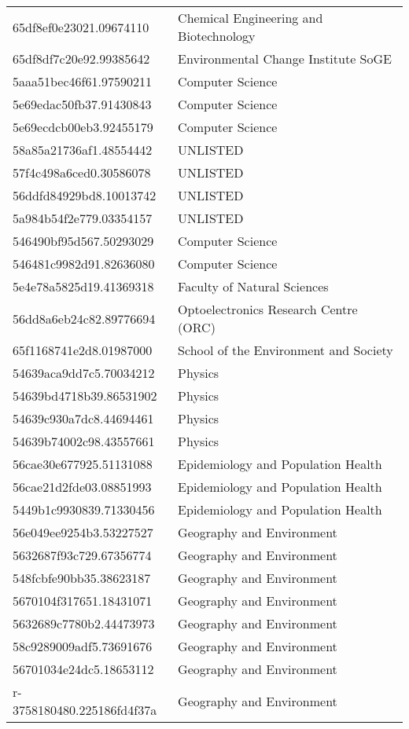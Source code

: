 \begin{tabular}{ll}
65df8ef0e23021.09674110 & Chemical Engineering and Biotechnology \\
65df8df7c20e92.99385642 & Environmental Change Institute SoGE \\
5aaa51bec46f61.97590211 & Computer Science \\
5e69edac50fb37.91430843 & Computer Science \\
5e69ecdcb00eb3.92455179 & Computer Science \\
58a85a21736af1.48554442 & UNLISTED \\
57f4c498a6ced0.30586078 & UNLISTED \\
56ddfd84929bd8.10013742 & UNLISTED \\
5a984b54f2e779.03354157 & UNLISTED \\
546490bf95d567.50293029 & Computer Science \\
546481c9982d91.82636080 & Computer Science \\
5e4e78a5825d19.41369318 & Faculty of Natural Sciences \\
56dd8a6eb24c82.89776694 & Optoelectronics Research Centre (ORC) \\
65f1168741e2d8.01987000 & School of the Environment and Society \\
54639aca9dd7c5.70034212 & Physics \\
54639bd4718b39.86531902 & Physics \\
54639c930a7dc8.44694461 & Physics \\
54639b74002c98.43557661 & Physics \\
56cae30e677925.51131088 & Epidemiology and Population Health \\
56cae21d2fde03.08851993 & Epidemiology and Population Health \\
5449b1c9930839.71330456 & Epidemiology and Population Health \\
56e049ee9254b3.53227527 & Geography and Environment \\
5632687f93c729.67356774 & Geography and Environment \\
548fcbfe90bb35.38623187 & Geography and Environment \\
5670104f317651.18431071 & Geography and Environment \\
5632689c7780b2.44473973 & Geography and Environment \\
58c9289009adf5.73691676 & Geography and Environment \\
56701034e24dc5.18653112 & Geography and Environment \\
r-3758180480.225186fd4f37a & Geography and Environment \\

\end{tabular}
